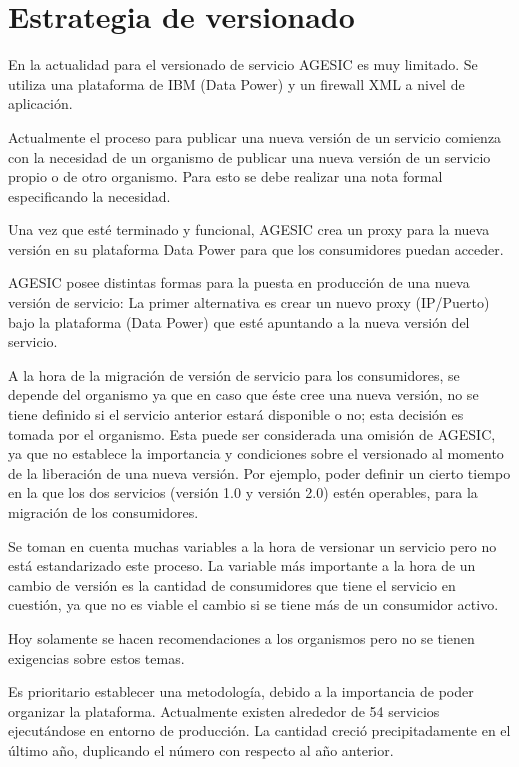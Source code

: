 \section{Estrategia de versionado}
\label{Analisis:EstrategiaVersionado}
En la actualidad para el versionado de servicio AGESIC es muy limitado. Se utiliza una plataforma de IBM (Data Power) y un firewall XML a nivel de aplicación.

Actualmente el proceso para publicar una nueva versión de un servicio comienza con la necesidad de un organismo de publicar una nueva versión de un servicio propio o de otro organismo. Para esto se debe realizar una nota formal especificando la necesidad.

Una vez que esté terminado y funcional, AGESIC crea un proxy para la nueva versión en su plataforma Data Power para que los consumidores puedan acceder.

AGESIC posee distintas formas para la puesta en producción de una nueva versión de servicio:
La primer alternativa es crear un nuevo proxy (IP/Puerto) bajo la plataforma (Data Power) que esté apuntando a la nueva versión del servicio.

A la hora de la migración de versión de servicio para los consumidores, se depende del organismo ya que en caso que éste cree una nueva versión, no se tiene definido si el servicio anterior estará disponible o no; esta decisión es tomada por el organismo. Esta puede ser considerada una omisión de AGESIC, ya que no establece la importancia y condiciones sobre el versionado al momento de la liberación de una nueva versión. Por ejemplo, poder definir un cierto tiempo en la que los dos servicios (versión 1.0 y versión 2.0) estén operables, para la migración de los consumidores.

Se toman en cuenta muchas variables a la hora de versionar un servicio pero no está estandarizado este proceso. La variable más importante a la hora de un cambio de versión es la cantidad de consumidores que tiene el servicio en cuestión, ya que no es viable el cambio si se tiene más de un consumidor activo. 

Hoy solamente se hacen recomendaciones a los organismos pero no se tienen exigencias sobre estos temas.

Es prioritario establecer una metodología, debido a la importancia de poder organizar la plataforma. Actualmente existen alrededor de 54 servicios ejecutándose en entorno de producción. La cantidad creció precipitadamente en el último año, duplicando el número con respecto al año anterior.

